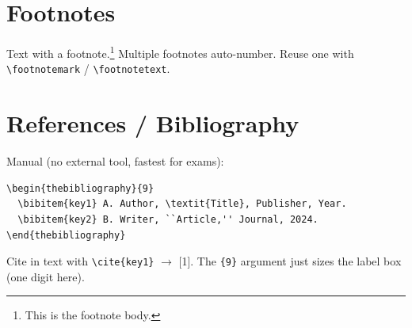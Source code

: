 \documentclass[11pt]{article}
\theoremstyle{plain}
\theoremstyle{definition}
\theoremstyle{remark}
\begin{document}
\section{Footnotes}
Text with a footnote.\footnote{This is the footnote body.}
Multiple footnotes auto-number. Reuse one with
\verb|\footnotemark| / \verb|\footnotetext|.

\section{References / Bibliography}
Manual (no external tool, fastest for exams):
\begin{verbatim}
\begin{thebibliography}{9}
  \bibitem{key1} A. Author, \textit{Title}, Publisher, Year.
  \bibitem{key2} B. Writer, ``Article,'' Journal, 2024.
\end{thebibliography}
\end{verbatim}
Cite in text with \verb|\cite{key1}| $\to$ [1]. The \verb|{9}| argument
just sizes the label box (one digit here).

\end{document}
